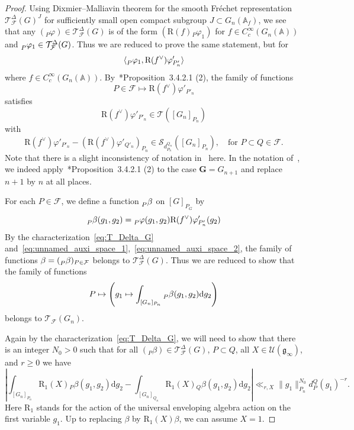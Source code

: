 \documentclass[letterpaper,11pt]{amsart}
\newcommand{\fg}{\mathfrak{g}}
\newcommand{\bA}{\mathbb{A}}
\newcommand{\cF}{\mathcal{F}}
\newcommand{\cS}{\mathcal{S}}
\newcommand{\cT}{\mathcal{T}}
\newcommand{\cU}{\mathcal{U}}
\newcommand{\rd}{\mathrm{d}}
\newcommand{\<}{\negthickspace}
\theoremstyle{definition}
\theoremstyle{plain}
\theoremstyle{remark}
\numberwithin{equation}{section}
\begin{document}
\begin{proof}
Using Dixmier--Malliavin theorem for the smooth Fr\'{e}chet representation $\cT^\Delta_\cF(G)^J$ for sufficiently small open compact subgroup $J \subset G_n(\bA_f)$, we see that any $({}_P \varphi) \in \cT^\Delta_{\cF}(G)$
is of the form $(\mathrm{R}(f) {}_P \varphi_1)$ for $f \in
C_c^\infty(G_n(\bA))$ and $\prescript{}{P}{\varphi_1} \in \cT^\Delta_{\cF}(G)$. Thus we are reduced to prove the same statement, but for
    \[
    \langle \prescript{}{P}{\varphi_1},
    \mathrm{R}(f^\vee)\varphi'_{P_n'} \rangle
    \]
where $f \in C_c^\infty(G_n(\bA))$. By~\cite{BPCZ}*{Proposition~3.4.2.1
(2)}, the family of functions
    \[
    P \in
    \cF \mapsto \mathrm{R}(f^\vee) \varphi'_{P'_n}
    \]
satisfies
    \begin{equation} \label{eq:unnamed_auxi_space_1}
    \mathrm{R}(f^\vee) \varphi'_{P'_n} \in \cT([G_n]_{P_n})
    \end{equation}
with
    \begin{equation} \label{eq:unnamed_auxi_space_2}
     \mathrm{R}(f^\vee) \varphi'_{P'_n}-
     (\mathrm{R}(f^\vee) \varphi'_{Q'_n})_{P_n}
     \in \cS_{d_{P_n}^{Q_n}}([G_n]_{P_n}), \quad
     \text{for $P \subset Q \in \cF$}.
    \end{equation}
Note that there is a slight inconsistency of notation in~\cite{BPCZ} here. In
the notation of~\cite{BPCZ}, we indeed apply~\cite{BPCZ}*{Proposition~3.4.2.1
(2)} to the case $\mathbf{G} = G_{n+1}$ and replace $n+1$ by $n$ at all
places.

For each $P \in \cF$, we define a function
$\prescript{}{P}{\beta}$ on $[G]_{P_G}$ by
    \[
    \prescript{}{P}{\beta}(g_1, g_2) = \prescript{}{P}{\varphi}(g_1,g_2)
    \mathrm{R}(f^\vee)
    \varphi'_{P_n'}(g_2)
    \]
By the characterization~\eqref{eq:T_Delta_G}
and~\eqref{eq:unnamed_auxi_space_1},~\eqref{eq:unnamed_auxi_space_2}, the family of functions $\beta = (\prescript{}{P}{\beta})_{P
\in \cF}$ belongs to $\cT_{\cF}^{\Delta}(G)$. Thus we are reduced to show that the family of functions
    \[
    P \mapsto \left( g_1 \mapsto \int_{[G_n]_{P_n}}
    \prescript{}{P}{\beta}
    (g_1, g_2) \rd g_2\right)
    \]
belongs to $\cT_{\cF}(G_n)$.

Again by the characterization~\eqref{eq:T_Delta_G}, we will need to show that there is an integer $N_0>0$ such that for all $({}_P \beta) \in \cT_\cF^\Delta(G)$, $P
\subset Q$, all $X \in \cU(\fg_\infty)$, and $r\geq 0$ we have
    \begin{equation}    \label{eq:wanted_estimate}
    \left| \int_{[G_n]_{P_n}}
    \mathrm{R}_1(X) {}_P \beta(g_1,g_2) \rd g_2 -
    \int_{[G_n]_{Q_n}}  \mathrm{R}_1(X)
    {}_Q{\beta}(g_1, g_2)  \rd g_2 \right|
    \ll_{r, X} \|g_1\|_{P_n}^{N_0} d_{P}^{Q}(g_1)^{-r}.
    \end{equation}
Here $\mathrm{R}_1$ stands for the action of the universal enveloping algebra
action on the first variable $g_1$. Up to replacing $\beta$ by $\mathrm{R}_1(X) \beta$, we can assume $X=1$.


\end{proof}
\end{document}
